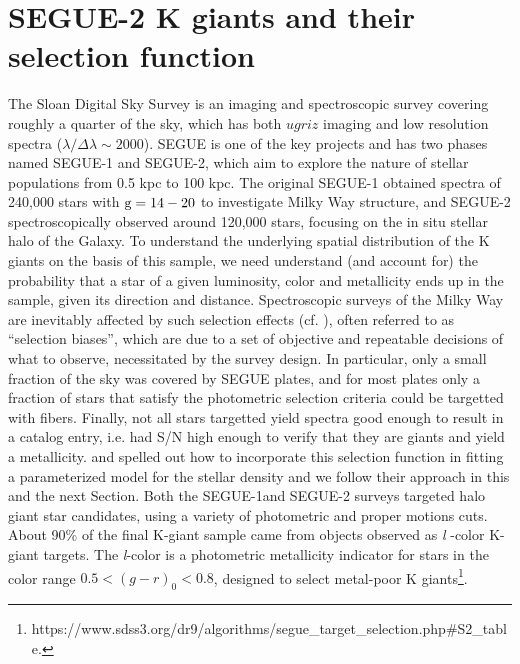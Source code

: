 \documentclass[12pt,preprint]{aastex}
\begin{document}
\section{SEGUE-2 K giants and their selection function}
The Sloan Digital Sky Survey\citep[SDSS;][]{York2000} is an imaging and spectroscopic survey covering roughly a quarter of the sky, which has both $ugriz$ imaging \citep{Fukugita1996, Gunn1998, Stoughton2002, Pier2003, Eisenstein2011} and low resolution spectra ($\lambda/\Delta \lambda \sim 2000$). SEGUE is one of
the key projects and has two phases named SEGUE-1 and SEGUE-2, which aim to explore the nature of stellar populations from 0.5 kpc to 100 kpc\citep[][and Rockosi et al. in prep.]{Yanny2009b}. The original SEGUE-1 obtained spectra of 240,000 stars with $\rm g=14-20$ to investigate Milky Way structure, and SEGUE-2 spectroscopically observed around 120,000 stars, focusing on the in situ stellar halo of the Galaxy.
To understand the underlying spatial distribution of the K giants on the basis of this sample, we need understand (and account for) the probability that a star of a given luminosity, color and metallicity ends up in the sample, given its direction and distance.
Spectroscopic surveys of the Milky Way are inevitably affected by such selection effects (cf. \citet{Rix2013}),
often referred to as ``selection biases'', which are due to a set of objective and repeatable decisions of what to observe,
necessitated by the survey design. In particular, only a small fraction of the sky was covered by SEGUE plates,
and for most plates only a fraction of stars that satisfy the photometric selection criteria could be targetted with fibers. Finally, not all stars targetted yield spectra good enough to result in a catalog entry, i.e. had S/N high enough to
verify that they are giants and yield a metallicity. \citet{Bovy2012} and \citet{Rix2013} spelled out how to incorporate this selection function in fitting a parameterized model for the stellar density and we follow their approach in this and the next Section.
Both the SEGUE-1and SEGUE-2 surveys targeted halo giant star candidates, using a variety of photometric and proper motions cuts. About 90\% of the final K-giant sample came from objects observed as \textit{l} -color K-giant targets.
The \textit{l}-color is a photometric metallicity indicator for stars in the color range $0.5 < (g-r)_0 < 0.8$, designed to select metal-poor K giants\footnote{https://www.sdss3.org/dr9/algorithms/segue\_target\_selection.php\#S2\_table.}.
\end{document}
